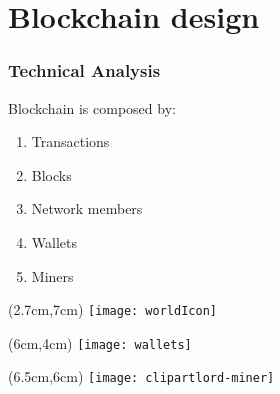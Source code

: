 \section{Blockchain design}
\begin{frame}
 \frametitle{Technical Analysis}

 Blockchain is composed by:
 \begin{enumerate}
  \item<1-> Transactions
  \item<2-> Blocks
  \item<3-> Network members
  \item<4-> Wallets
  \item<5-> Miners
 \end{enumerate}


 \begin{textblock*}{5cm}(2.7cm,7cm)
  \texttt{[image: worldIcon]}
 \end{textblock*}

 \begin{textblock*}{5cm}(6cm,4cm)
  \texttt{[image: wallets]}
 \end{textblock*}

 \begin{textblock*}{5cm}(6.5cm,6cm)
  \texttt{[image: clipartlord-miner]}
 \end{textblock*}


\end{frame}

